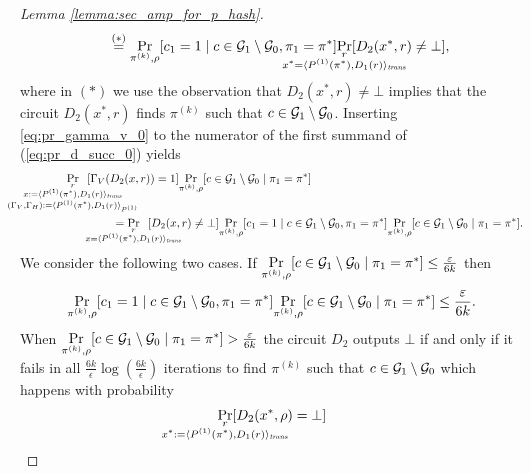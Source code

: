 \begin{proof}[Lemma \ref{lemma:sec_amp_for_p_hash}]
\begin{align}
  &\IndI \stackrel{(*)}{=}
  \underset{\pi^{(k)}, \rho}{\Pr}[c_1 = 1 \mid c \in \cG_1 \setminus \cG_0, \pi_1 = \pi^*]
  \underset{\mathclap{\substack{r \\ x^* = \langle P^{(1)}(\pi^*), D_1(r) \rangle_{\mathit{trans}}}}} {\Pr}[D_2(x^*,r) \neq \bot],
\end{align}
where in $(*)$ we use the observation that $D_2(x^*, r) \neq \bot$ implies that the circuit $D_2(x^*, r)$ finds $\pi^{(k)}$
such that $c \in \mathcal{G}_1 \setminus \mathcal{G}_0$.
Inserting \eqref{eq:pr_gamma_v_0} to the numerator of the first summand of (\ref{eq:pr_d_succ_0}) yields
\begin{align}
\IndII &\underset{
  \mathclap{
  \substack{r \\
    x := \langle P^{(1)}(\pi^*), D_1 (r) \rangle_{\mathit{trans}} \\
    (\Gamma_V, \Gamma_H) := \langle P^{(1)}(\pi^*), D_1(r) \rangle_{P^{(1)}} }}}
{\Pr}\mkern13mu[\Gamma_V(D_2(x, r)) = 1]
\underset{\pi^{(k)},\rho}{\Pr}[c \in \cG_1 \setminus \cG_0 \mid \pi_1 = \pi^*] \notag\\
  &\IndII = \underset{\mathclap{\substack{r
      \\ x = \langle P^{(1)}(\pi^*), D_1(r) \rangle_{\mathit{trans}}}}}
  {\Pr}\mkern13mu[D_2(x,r) \neq \bot]
  \underset{\pi^{(k)}, \rho}{\Pr}[c_1 = 1 \mid c \in \cG_1 \setminus \cG_0, \pi_1 = \pi^*]
  \underset{\pi^{(k)}, \rho}{\Pr}[c \in \cG_1 \setminus \cG_0 \mid \pi_1 = \pi^*].
\end{align}
We consider the following two cases. If $\underset{\pi^{(k)}, \rho}{\Pr}[ c \in \mathcal{G}_1 \setminus \mathcal{G}_0 \mid \pi_1 = \pi^*] \leq \frac{\varepsilon}{6k}$ then
\begin{align}
  \label{ineq:case_0}
  \underset{\pi^{(k)}, \rho}{\Pr}[c_1 = 1 \mid c \in \mathcal{G}_1 \setminus \mathcal{G}_0, \pi_1 = \pi^*] \underset{\pi^{(k)}, \rho}{\Pr}[c \in \mathcal{G}_1 \setminus \mathcal{G}_0 \mid \pi_1 = \pi^*] \leq \frac{\varepsilon}{6k}.
\end{align}
When $\underset{\pi^{(k)}, \rho}{\Pr}[c \in \mathcal{G}_1 \setminus \mathcal{G}_0 \mid \pi_1 = \pi^*] > \frac{\varepsilon}{6k}$ the circuit $D_2$ outputs $\bot$
if and only if it fails in all $\frac{6k}{\epsilon} \log(\frac{6k}{\epsilon})$ iterations to find $\pi^{(k)}$ such that $c \in \mathcal{G}_1 \setminus \mathcal{G}_0$
which happens with probability
\begin{align}
  \label{ineq:case_1}
\underset{
  \mathclap{
    \substack{
      r \\
      x^* := \langle P^{(1)}(\pi^*), D_1(r) \rangle_{\mathit{trans}}}}}
{\Pr}[D_2(x^*,\rho) = \bot]

\end{align}
\end{proof}
